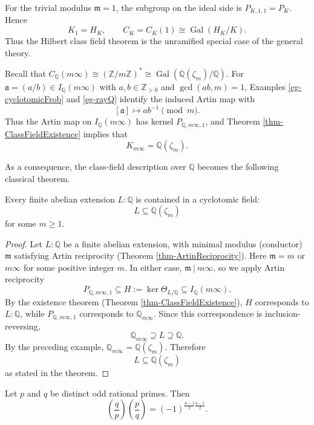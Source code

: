 \begin{example} 
For the trivial modulus $\mathfrak m=1$, the subgroup on the ideal side is
$P_{K,1,1}=P_K$. Hence
\[
K_1=H_K,
\qquad
C_K=C_K(1)
\cong\operatorname{Gal}(H_K/K).
\]
Thus the Hilbert class field theorem is the unramified special case of the general theory.
\end{example}

\begin{example}
Recall that
\(C_{\mathbb Q}(m\infty)\cong(\mathbb Z/m\mathbb Z)^* \cong \operatorname{Gal}(\mathbb Q(\zeta_m)/\mathbb Q)
\). For $\mathfrak a=(a/b)\in I_{\mathbb Q}(m\infty)$ with $a,b\in\mathbb Z_{>0}$ and $\gcd(ab,m)=1$, Examples \ref{eg-cyclotomicFrob} and \ref{eg-rayQ} identify the induced Artin map with
\[
[\mathfrak a]\longmapsto ab^{-1}\pmod m.
\]
Thus the Artin map on $I_{\mathbb Q}(m\infty)$ has kernel $P_{\mathbb Q,m\infty,1}$, and Theorem \ref{thm-ClassFieldExistence} implies that
\[
\boxed{K_{m\infty}=\mathbb Q(\zeta_m).}
\]
\end{example}

As a consequence, the class-field description over $\mathbb Q$ becomes the following
classical theorem.

\begin{theorem}\label{thm-KroneckerWeber}
Every finite abelian extension $L:\mathbb Q$ is contained in a cyclotomic field:
\[
L\subseteq\mathbb Q(\zeta_m)
\]
for some $m\geq1$.
\end{theorem}
\begin{proof}
Let $L:\mathbb Q$ be a finite abelian extension, with minimal modulus (conductor) $\mathfrak m$
satisfying Artin reciprocity (Theorem \ref{thm-ArtinReciprocity}). Here $\mathfrak m = m$ or $m\infty$ for some positive integer $m$. In either case, 
$\mathfrak m\ |\ m\infty$, so we apply Artin reciprocity
\[
P_{\mathbb Q,m\infty,1}
\subseteq
H:=\ker\Theta_{L/\mathbb Q} \subseteq I_{\mathbb Q}(m\infty).
\]
By the existence theorem (Theorem \ref{thm-ClassFieldExistence}), $H$ corresponds to $L:\mathbb Q$, while $P_{\mathbb Q,m\infty,1}$ corresponds to $\mathbb Q_{m\infty}$. Since this correspondence is inclusion-reversing,
\[
\mathbb Q_{m\infty} 
\supseteq
L \supseteq \mathbb{Q}.
\]
By the preceding example,
\(\mathbb Q_{m\infty}=\mathbb Q(\zeta_m).
\) Therefore
\[
L\subseteq\mathbb Q(\zeta_m)
\]
as stated in the theorem.
\end{proof}

\begin{theorem}\label{thm-QuadraticReciprocity}
Let $p$ and $q$ be distinct odd rational primes. Then
\[\left(\frac qp\right) \left(\frac pq\right)
=(-1)^{\frac{p-1}{2}\frac{q-1}{2}}.\]
\end{theorem}

